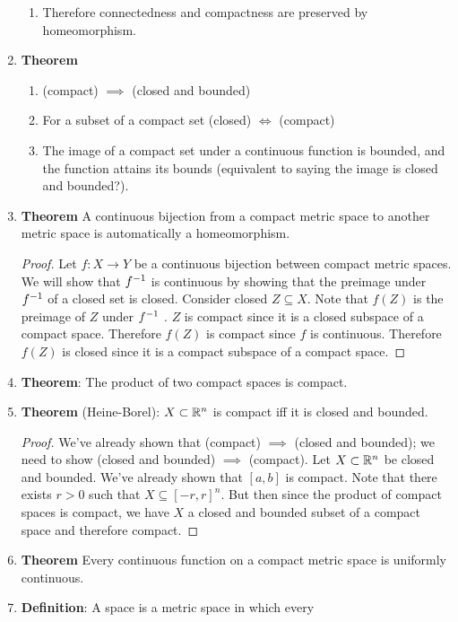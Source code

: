 \begin{enumerate}
\begin{enumerate}[label=(\roman*)]
  \item Therefore connectedness and compactness are preserved by homeomorphism.
  \end{enumerate}
\item {\bf Theorem}
  \begin{enumerate}[label=(\roman*)]
  \item (compact) $\implies$ (closed and bounded)
  \item For a subset of a compact set (closed) $\iff$ (compact)
  \item The image of a compact set under a continuous function is bounded, and the function attains
    its bounds (equivalent to saying the image is closed and bounded?).
  \end{enumerate}
\item {\bf Theorem} A continuous bijection from a compact metric space to another metric space is
  automatically a homeomorphism.
  \begin{proof}
    Let $f: X \to Y$ be a continuous bijection between compact metric spaces. We will show that
    $f^{-1}$ is continuous by showing that the preimage under $f^{-1}$ of a closed set is closed.
    Consider closed $Z \subseteq X$. Note that $f(Z)$ is the preimage of $Z$ under $f^{-1}$ . $Z$ is
    compact since it is a closed subspace of a compact space. Therefore $f(Z)$ is compact since $f$
    is continuous. Therefore $f(Z)$ is closed since it is a compact subspace of a compact space.
  \end{proof}
\item {\bf Theorem}: The product of two compact spaces is compact.
\item {\bf Theorem} (Heine-Borel): $X \subset \mathbb{R}^n$ is compact iff it is closed and bounded.
  \begin{proof}
    We've already shown that (compact) $\implies$ (closed and bounded); we need to show (closed and
    bounded) $\implies$ (compact). Let $X \subset \mathbb{R}^n$ be closed and bounded. We've already shown
    that $[a, b]$ is compact. Note that there exists $r > 0$ such that $X \subseteq [-r, r]^n$. But
    then since the product of compact spaces is compact, we have $X$ a closed and bounded subset of
    a compact space and therefore compact.
  \end{proof}
\item {\bf Theorem} Every continuous function on a compact metric space is uniformly continuous.
\item {\bf Definition}: A  space is a metric space in which every

\end{enumerate}

